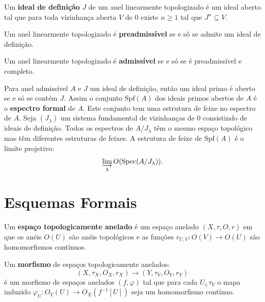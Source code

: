 \documentclass[11pt,twoside,a4paper]{book}
\begin{document}
\begin{definicao}
Um \textbf{ideal de definição} $J$ de um anel linearmente topologizado é um ideal aberto tal que para toda vizinhança aberta $V$ de $0$ existe $n\geq 1$ tal que $J^n\subseteq V.$
\end{definicao}

\begin{definicao}
Um anel linearmente topologizado é \textbf{preadmissível} se e só se admite um ideal de definição.
\end{definicao}

\begin{definicao}
Um anel linearmente topologizado é \textbf{admissível} se e só se é preadmissível e completo.
\end{definicao}

\begin{definicao}
Para anel admissível $A$ e $J$ um ideal de definição, então um ideal primo é aberto se e só se contém $J.$ Assim o conjunto $\mathrm{Spf}(A)$ dos ideais primos abertos de $A$ é o \textbf{espectro formal} de $A.$ Este conjunto tem uma estrutura de feixe no espectro de $A.$ Seja $(J_\lambda)$ um sistema fundamental de vizinhanças de $0$ consistindo de ideais de definição. Todos os espectros de $A/J_\lambda$ têm o mesmo espaço topológico mas têm diferentes estruturas de feixes. A estrutura de feixe de $\mathrm{Spf}(A)$ é o limite projetivo:
\[
\varinjlim_\lambda O(\mathrm{Spec}(A/J_\lambda)).
\]
\end{definicao}

\section{Esquemas Formais}

\begin{definicao}
Um \textbf{espaço topologicamente anelado} é um espaço anelado $(X,\tau,O,r)$ em que os anéis $O(U)$ são anéis topológicos e as funções $r_{U,V}:O(V)\rightarrow O(U)$ são homomorfismos contínuos.
\end{definicao}

\begin{definicao}
Um \textbf{morfismo} de espaços topologicamente anelados:
\[
(X,\tau_X,O_X,r_X)\rightarrow(Y,\tau_Y,O_Y,r_Y)
\]
é um morfismo de espaços anelados $(f,\varphi)$ tal que para cada $U_\in\tau_Y$ o mapa induzido $\varphi_U:O_Y(U)\rightarrow O_X(f^{-1}[U])$ seja um homomorfismo contínuo.
\end{definicao}
\end{document}
